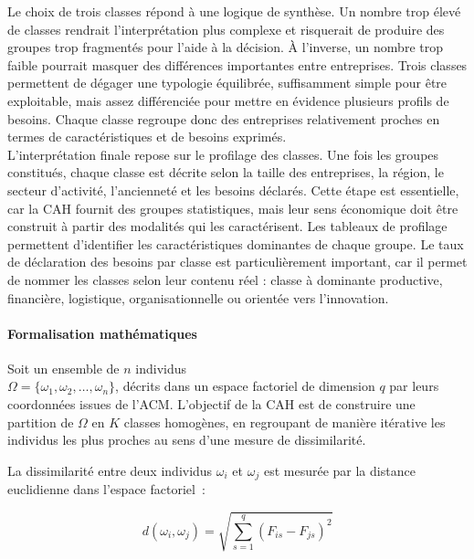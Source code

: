 \documentclass[12pt, a4paper, oneside]{report}
\begin{document}
\begin{enumerate}
	Le choix de trois classes répond à une logique de synthèse. Un nombre trop élevé de classes rendrait l’interprétation plus complexe et risquerait de produire des groupes trop fragmentés pour l’aide à la décision. À l’inverse, un nombre trop faible pourrait masquer des différences importantes entre entreprises. Trois classes permettent de dégager une typologie équilibrée, suffisamment simple pour être exploitable, mais assez différenciée pour mettre en évidence plusieurs profils de besoins. Chaque classe regroupe donc des entreprises relativement proches en termes de caractéristiques et de besoins exprimés.\\
	
	L’interprétation finale repose sur le profilage des classes. Une fois les groupes constitués, chaque classe est décrite selon la taille des entreprises, la région, le secteur d’activité, l’ancienneté et les besoins déclarés. Cette étape est essentielle, car la CAH fournit des groupes statistiques, mais leur sens économique doit être construit à partir des modalités qui les caractérisent. Les tableaux de profilage permettent d’identifier les caractéristiques dominantes de chaque groupe. Le taux de déclaration des besoins par classe est particulièrement important, car il permet de nommer les classes selon leur contenu réel : classe à dominante productive, financière, logistique, organisationnelle ou orientée vers l’innovation.\\
	
	
	\paragraph{Formalisation mathématiques}
	Soit un ensemble de $n$ individus\\ $\Omega = \{\omega_1, \omega_2,
	\ldots, \omega_n\}$, décrits dans un espace factoriel de dimension $q$
	par leurs coordonnées issues de l'ACM. L'objectif de la CAH est de
	construire une partition de $\Omega$ en $K$ classes homogènes, en
	regroupant de manière itérative les individus les plus proches au sens
	d'une mesure de dissimilarité.
	
	La dissimilarité entre deux individus $\omega_i$ et $\omega_j$ est
	mesurée par la distance euclidienne dans l'espace factoriel~:
	
	\begin{equation}
		d(\omega_i, \omega_j) =
		\sqrt{\sum_{s=1}^{q} \left(F_{is} - F_{js}\right)^2}
		\label{eq:distance_euclidienne}
	\end{equation}
	

\end{enumerate}
\end{document}
